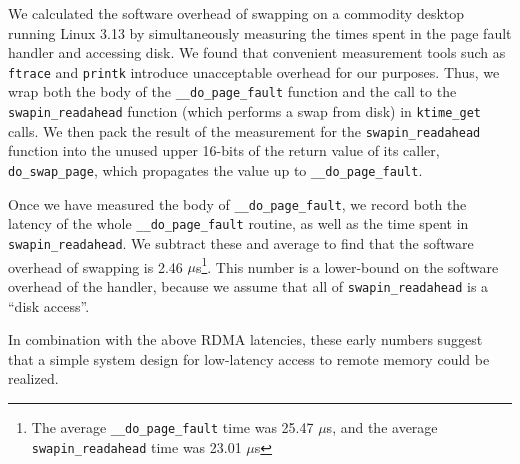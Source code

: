 We calculated the software overhead of swapping on a commodity desktop running Linux 3.13 by simultaneously measuring the times spent in the page fault handler and accessing disk. 
We found that convenient measurement tools such as \texttt{ftrace} and \texttt{printk} introduce unacceptable overhead for our purposes. 
Thus, we wrap both the body of the \texttt{\_\_do\_page\_fault} function and the call to the \texttt{swapin\_readahead} function (which performs a swap from disk) in \texttt{ktime\_get} calls.  
We then pack the result of the measurement for the \texttt{swapin\_readahead} function into the unused upper 16-bits of the return value of its caller, \texttt{do\_swap\_page}, which propagates the value up to \texttt{\_\_do\_page\_fault}. 

Once we have measured the body of \texttt{\_\_do\_page\_fault}, we record both the latency of the whole \texttt{\_\_do\_page\_fault} routine, as well as the time spent in \texttt{swapin\_readahead}. 
We subtract these and average to find that the software overhead of swapping is 2.46 $\mu$s\footnote{The average \texttt{\_\_do\_page\_fault} time was 25.47 $\mu$s, and the average \texttt{swapin\_readahead} time was 23.01 $\mu$s}. 
This number is a lower-bound on the software overhead of the handler, because we assume that all of \texttt{swapin\_readahead} is a ``disk access''.%

In combination with the above RDMA latencies, these early numbers suggest that a simple system design for low-latency access to remote memory could be realized. 



